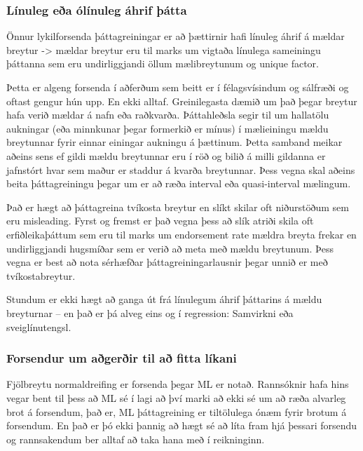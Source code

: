 \documentclass[]{book}
\begin{document}
\hypertarget{luxednuleg-euxf0a-uxf3luxednuleg-uxe1hrif-uxfeuxe1tta}{%
\subsubsection{Línuleg eða ólínuleg áhrif þátta}\label{luxednuleg-euxf0a-uxf3luxednuleg-uxe1hrif-uxfeuxe1tta}}

Önnur lykilforsenda þáttagreiningar er að þættirnir hafi línuleg áhrif á mældar breytur -\textgreater{} mældar breytur eru til marks um vigtaða línulega sameiningu þáttanna sem eru undirliggjandi öllum mælibreytunum og unique factor.

Þetta er algeng forsenda í aðferðum sem beitt er í félagsvísindum og sálfræði og oftast gengur hún upp. En ekki alltaf. Greinilegasta dæmið um það þegar breytur hafa verið mældar á nafn eða raðkvarða. Þáttahleðsla segir til um hallatölu aukningar (eða minnkunar þegar formerkið er mínus) í mælieiningu mældu breytunnar fyrir einnar einingar aukningu á þættinum. Þetta samband meikar aðeins sens ef gildi mældu breytunnar eru í röð og bilið á milli gildanna er jafnstórt hvar sem maður er staddur á kvarða breytunnar. Þess vegna skal aðeins beita þáttagreiningu þegar um er að ræða interval eða quasi-interval mælingum.

Það er hægt að þáttagreina tvíkosta breytur en slíkt skilar oft niðurstöðum sem eru misleading. Fyrst og fremst er það vegna þess að slík atriði skila oft erfiðleikaþáttum sem eru til marks um endorsement rate mældra breyta frekar en undirliggjandi hugsmíðar sem er verið að meta með mældu breytunum. Þess vegna er best að nota sérhæfðar þáttagreiningarlausnir þegar unnið er með tvíkostabreytur.

Stundum er ekki hægt að ganga út frá línulegum áhrif þáttarins á mældu breyturnar -- en það er þá alveg eins og í regression: Samvirkni eða sveiglínutengsl.

\hypertarget{forsendur-um-auxf0geruxf0ir-til-auxf0-fitta-luxedkani}{%
\subsubsection{Forsendur um aðgerðir til að fitta líkani}\label{forsendur-um-auxf0geruxf0ir-til-auxf0-fitta-luxedkani}}

Fjölbreytu normaldreifing er forsenda þegar ML er notað. Rannsóknir hafa hins vegar bent til þess að ML sé í lagi að því marki að ekki sé um að ræða alvarleg brot á forsendum, það er, ML þáttagreining er tiltölulega ónæm fyrir brotum á forsendum. En það er þó ekki þannig að hægt sé að líta fram hjá þessari forsendu og rannsakendum ber alltaf að taka hana með í reikninginn.
\end{document}
